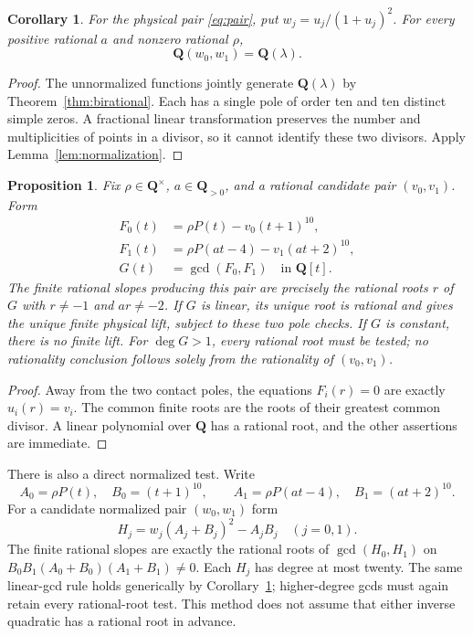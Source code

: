 \documentclass[11pt,a4paper]{article}
\newcommand{\Q}{\mathbf Q}
\newtheorem{proposition}[theorem]{Proposition}
\newtheorem{corollary}[theorem]{Corollary}
\begin{document}
\begin{corollary}\label{cor:normalized-birational}
For the physical pair \eqref{eq:pair}, put
$w_j=u_j/(1+u_j)^2$. For every positive rational $a$ and nonzero
rational $\rho$,
\[
                         \Q(w_0,w_1)=\Q(\lambda).
\]
\end{corollary}
\begin{proof}
The unnormalized functions jointly generate $\Q(\lambda)$ by
Theorem~\ref{thm:birational}. Each has a single pole of order ten
and ten distinct simple zeros. A fractional linear transformation
preserves the number and multiplicities of points in a divisor,
so it cannot identify these two divisors. Apply
Lemma~\ref{lem:normalization}.
\end{proof}

\begin{proposition}\label{prop:lift}
Fix $\rho\in\Q^\times$, $a\in\Q_{>0}$, and a rational candidate
pair $(v_0,v_1)$. Form
\[
\begin{split}
 F_0(t)&=\rho P(t)-v_0(t+1)^{10},\\
 F_1(t)&=\rho P(at-4)-v_1(at+2)^{10},\\
 G(t)&=\gcd(F_0,F_1)\quad\text{in }\Q[t].
\end{split}
\]
The finite rational slopes producing this pair are precisely the
rational roots $r$ of $G$ with $r\ne-1$ and $ar\ne-2$.
If $G$ is linear, its unique root is rational and gives the unique
finite physical lift, subject to these two pole checks.
If $G$ is constant, there is no finite lift. For $\deg G>1$,
every rational root must be tested; no rationality conclusion follows
solely from the rationality of $(v_0,v_1)$.
\end{proposition}
\begin{proof}
Away from the two contact poles, the equations $F_i(r)=0$ are
exactly $u_i(r)=v_i$. The common finite roots are the roots of
their greatest common divisor. A linear polynomial over $\Q$
has a rational root, and the other assertions are immediate.
\end{proof}

There is also a direct normalized test. Write
\[
 A_0=\rho P(t),\quad B_0=(t+1)^{10},\qquad
 A_1=\rho P(at-4),\quad B_1=(at+2)^{10}.
\]
For a candidate normalized pair $(w_0,w_1)$ form
\begin{equation}\label{eq:normalized-gcd}
 H_j=w_j(A_j+B_j)^2-A_jB_j\quad(j=0,1).
\end{equation}
The finite rational slopes are exactly the rational roots of
$\gcd(H_0,H_1)$ on $B_0B_1(A_0+B_0)(A_1+B_1)\ne0$.
Each $H_j$ has degree at most twenty. The same linear-gcd rule
holds generically by Corollary~\ref{cor:normalized-birational};
higher-degree gcds must again retain every rational-root test.
This method does not assume that either inverse quadratic has
a rational root in advance.
\end{document}

